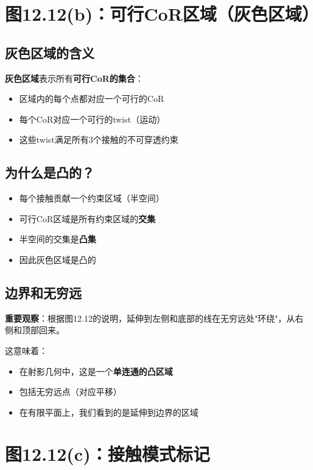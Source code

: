 \documentclass[12pt,a4paper]{article}
\begin{document}
\section{图12.12(b)：可行CoR区域（灰色区域）}

\subsection{灰色区域的含义}

\textbf{灰色区域}表示所有\textbf{可行CoR的集合}：

\begin{itemize}
\item 区域内的每个点都对应一个可行的CoR
\item 每个CoR对应一个可行的twist（运动）
\item 这些twist满足所有3个接触的不可穿透约束
\end{itemize}

\subsection{为什么是凸的？}

\begin{itemize}
\item 每个接触贡献一个约束区域（半空间）
\item 可行CoR区域是所有约束区域的\textbf{交集}
\item 半空间的交集是\textbf{凸集}
\item 因此灰色区域是凸的
\end{itemize}

\subsection{边界和无穷远}

\textbf{重要观察}：根据图12.12的说明，延伸到左侧和底部的线在无穷远处"环绕"，从右侧和顶部回来。

这意味着：
\begin{itemize}
\item 在射影几何中，这是一个\textbf{单连通的凸区域}
\item 包括无穷远点（对应平移）
\item 在有限平面上，我们看到的是延伸到边界的区域
\end{itemize}

\section{图12.12(c)：接触模式标记}
\end{document}
